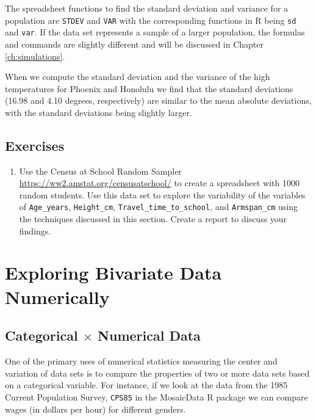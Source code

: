 \documentclass[
]{book}
\providecommand{\tightlist}{%
  \setlength{\itemsep}{0pt}\setlength{\parskip}{0pt}}
\theoremstyle{definition}
\theoremstyle{definition}
\theoremstyle{definition}
\theoremstyle{definition}
\theoremstyle{remark}
\begin{document}
The spreadsheet functions to find the standard deviation and variance for a population are \texttt{STDEV} and \texttt{VAR} with the corresponding functions in R being \texttt{sd} and \texttt{var}. If the data set represents a sample of a larger population, the formulas and commands are slightly different and will be discussed in Chapter \ref{ch:simulations}.

When we compute the standard deviation and the variance of the high temperatures for Phoenix and Honolulu we find that the standard deviations (16.98 and 4.10 degrees, respectively) are similar to the mean absolute deviations, with the standard deviations being slightly larger.

\hypertarget{exercises-63}{%
\subsection{Exercises}\label{exercises-63}}

\begin{enumerate}
\def\labelenumi{\arabic{enumi}.}
\tightlist
\item
  Use the Census at School Random Sampler \url{https://ww2.amstat.org/censusatschool/} to create a spreadsheet with 1000 random students. Use this data set to explore the variability of the variables of \texttt{Age\_years}, \texttt{Height\_cm}, \texttt{Travel\_time\_to\_school}, and \texttt{Armspan\_cm} using the techniques discussed in this section. Create a report to discuss your findings.
\end{enumerate}

\hypertarget{exploring-bivariate-data-numerically}{%
\section{Exploring Bivariate Data Numerically}\label{exploring-bivariate-data-numerically}}

\hypertarget{categorical-times-numerical-data}{%
\subsection{\texorpdfstring{Categorical \(\times\) Numerical Data}{Categorical \textbackslash times Numerical Data}}\label{categorical-times-numerical-data}}

One of the primary uses of numerical statistics measuring the center and variation of data sets is to compare the properties of two or more data sets based on a categorical variable. For instance, if we look at the data from the 1985 Current Population Survey, \texttt{CPS85} in the MosaicData R package we can compare wages (in dollars per hour) for different genders.
\end{document}
